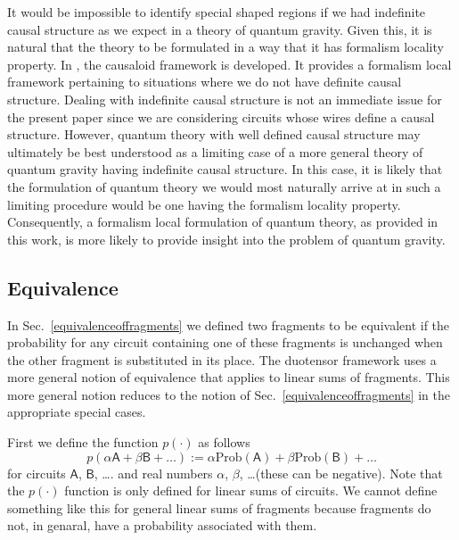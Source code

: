 \documentclass[10pt]{article}
\begin{document}
It would be impossible to identify special shaped regions if we had indefinite causal structure  as we expect in a theory of quantum gravity.  Given this, it is natural that the theory to be formulated in a way that it has formalism locality property.   In \cite{hardy2005probability, hardy2007towards, markes2009entropy, hardy2009quantum3, hardy2010bformalism}, the causaloid framework is developed. It provides a formalism local framework pertaining to situations where we do not have definite causal structure.  Dealing with indefinite causal structure is not an immediate issue for the present paper since we are considering circuits whose wires define a causal structure. However, quantum theory with well defined causal structure may ultimately be best understood as a limiting case of a more general theory of quantum gravity having indefinite causal structure.  In this case, it is likely that the formulation of quantum theory we would most naturally arrive at in such a limiting procedure would be one having the formalism locality property.  Consequently, a formalism local formulation of quantum theory, as provided in this work, is more likely to provide insight into the problem of quantum gravity.




\subsection{Equivalence}\label{equivalenceforduotensors}

In Sec.\ \ref{equivalenceoffragments} we defined two fragments to be equivalent if the probability for any circuit containing one of these fragments is unchanged when the other fragment is substituted in its place.   The duotensor framework uses a more general notion of equivalence that applies to linear sums of fragments.  This more general notion reduces to the notion of Sec.\ \ref{equivalenceoffragments} in the appropriate special cases.

First we define the function $p(\cdot)$  as follows
\begin{equation}
p(\alpha \mathsf{A} + \beta \mathsf{B} + \dots) := \alpha\text{Prob}(\mathsf{A}) + \beta\text{Prob}(\mathsf{B}) +\dots
\nonumber\end{equation}
for circuits $\mathsf A$, $\mathsf B$, \dots. and real numbers $\alpha$, $\beta$, \dots (these can be negative).   Note that the $p(\cdot)$ function is only defined for linear sums of circuits.  We cannot define something like this for general linear sums of fragments because fragments do not, in genaral, have a probability associated with them.
\end{document}
